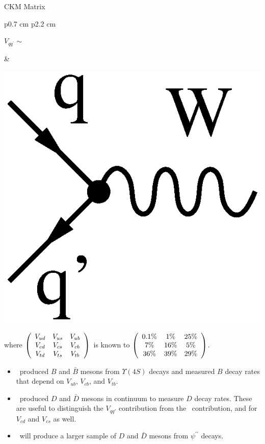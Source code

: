 \begin{slide*}
\slideframe{}
\begin{minipage}[t]{\linewidth}
\large

\vspace{0.2 cm}

{\huge CKM Matrix}

\begin{tabular}{p{0.7 cm} p{2.2 cm}}
  \begin{minipage}{\linewidth}
    $V_{qq^\prime} \sim $
  \end{minipage} &
  \begin{minipage}{\linewidth}
    \includegraphics[height=2 cm]{vertex_w.eps}
  \end{minipage}
\end{tabular}
where
$\left( \begin{array}{c c c}
          V_{ud} & V_{us} & V_{ub} \\
          V_{cd} & V_{cs} & V_{cb} \\
          V_{td} & V_{ts} & V_{tb} \end{array} \right)$ is known to
$\left( \begin{array}{c c c}
          0.1\% & 1\%  & 25\% \\
          7\%   & 16\% &  5\% \\
          36\%  & 39\% & 29\% \end{array} \right)$.

\Large
\begin{itemize}

  \item \cleoiii\ produced $B$ and $\bar{B}$ mesons from
  $\Upsilon(4S)$ decays and measured $B$ decay rates that depend on
  $V_{ub}$, $V_{cb}$, and $V_{tb}$.

  \item \cleoiii\ produced $D$ and $\bar{D}$ mesons in continuum to
  measure $D$ decay rates.  These are useful to distinguish the
  $V_{qq'}$ contribution from the \qcd\ contribution, and for $V_{cd}$
  and $V_{cs}$ as well.

  \item \cleoc\ will produce a larger sample of $D$ and $\bar{D}$
  mesons from $\psi^{\prime\prime}$ decays.


\end{itemize}
\end{minipage}
\end{slide*}
